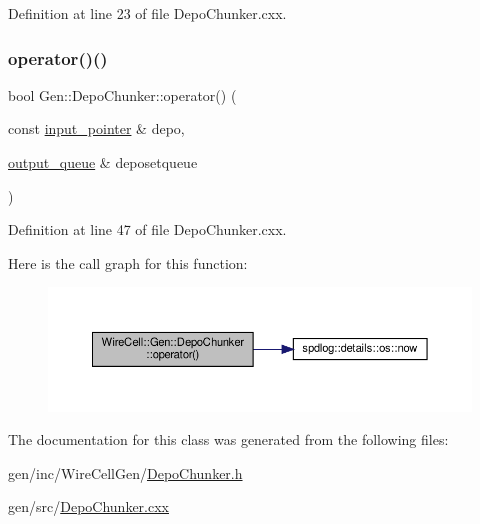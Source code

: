Definition at line 23 of file Depo\+Chunker.\+cxx.

\mbox{\label{class_wire_cell_1_1_gen_1_1_depo_chunker_a695d04f8e591f88384961d3dafcc8449}} 
\subsubsection{\texorpdfstring{operator()()}{operator()()}}
{\footnotesize\ttfamily bool Gen\+::\+Depo\+Chunker\+::operator() (\begin{DoxyParamCaption}\item[{const \hyperlink{class_wire_cell_1_1_i_queuedout_node_acf5f716a764553f3c7055a9cf67e906e}{input\+\_\+pointer} \&}]{depo,  }\item[{\hyperlink{class_wire_cell_1_1_i_queuedout_node_a39018e4e3dd886befac9636ac791a685}{output\+\_\+queue} \&}]{deposetqueue }\end{DoxyParamCaption})\hspace{0.3cm}{\ttfamily [virtual]}}



Definition at line 47 of file Depo\+Chunker.\+cxx.

Here is the call graph for this function\+:
\nopagebreak
\begin{figure}[H]
\begin{center}
\leavevmode
\includegraphics[width=350pt]{class_wire_cell_1_1_gen_1_1_depo_chunker_a695d04f8e591f88384961d3dafcc8449_cgraph}
\end{center}
\end{figure}


The documentation for this class was generated from the following files\+:\begin{DoxyCompactItemize}
\item 
gen/inc/\+Wire\+Cell\+Gen/\hyperlink{_depo_chunker_8h}{Depo\+Chunker.\+h}\item 
gen/src/\hyperlink{_depo_chunker_8cxx}{Depo\+Chunker.\+cxx}\end{DoxyCompactItemize}

